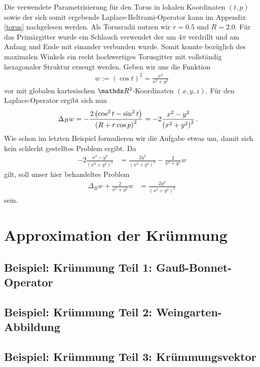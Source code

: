     \begin{beispiel}[Torus]
      Die verwendete Parametrisierung für den Torus in lokalen Koordinaten \( (t,p) \) sowie der sich somit ergebende
      Laplace-Beltrami-Operator kann im Appendix \ref{torus} nachgelesen werden.
      Als Torusradii nutzen wir \( r=0.5 \) und \( R=2.0 \).
      Für das Primärgitter wurde ein Schlauch verwendet der um \( 4\pi \) verdrillt und am Anfang und Ende
      mit einander verbunden wurde.
      Somit konnte bezüglich des maximalen Winkels ein recht hochwertiges Torusgitter mit vollständig
      hexagonaler Struktur erzeugt werden. 
      Geben wir uns die Funktion
      \begin{align}
        w := (\cos t)^{2} = \frac{x^{2}}{x^{2}+y^{2}}
      \end{align}
      vor mit globalen kartesischen \( \R^{3} \)-Koordinaten \( (x,y,z) \).
      Für den Laplace-Operator ergibt sich nun
      \begin{align}
        \Delta_{B} w &= -\frac{2 \left( \cos^{2} t - \sin^{2} t \right)}{\left( R + r\cos p \right)^{2}} 
                      = -2 \frac{x^{2} - y^{2}}{\left( x^{2} + y^{2} \right)^{2}} \,\text{.}
      \end{align}
      Wie schon im letzten Beispiel formulieren wir die Aufgabe etwas um, damit sich kein schlecht gestelltes
      Problem ergibt.
      Da
      \begin{align}
        -2 \frac{x^{2} - y^{2}}{\left( x^{2} + y^{2} \right)^{2}}
            &= \frac{2 y^{2}}{\left( x^{2} + y^{2} \right)^{2}} - \frac{2}{x^{2}+y^{2}} w
      \end{align}
      gilt, soll unser hier behandeltes Problem
      \begin{align}
        \label{eqLaplaceTorusProblemUmform}
        \Delta_{B} w + \frac{2}{x^{2}+y^{2}} w &= \frac{2 y^{2}}{\left( x^{2} + y^{2} \right)^{2}}
      \end{align}
      sein.
    \end{beispiel}

\section{Approximation der Krümmung}
  \subsection{Beispiel: Krümmung Teil 1: Gauß-Bonnet-Operator}
  \subsection{Beispiel: Krümmung Teil 2: Weingarten-Abbildung}
  \subsection{Beispiel: Krümmung Teil 3: Krümmungsvektor}
  \label{subsecKruemmungsvektor}


